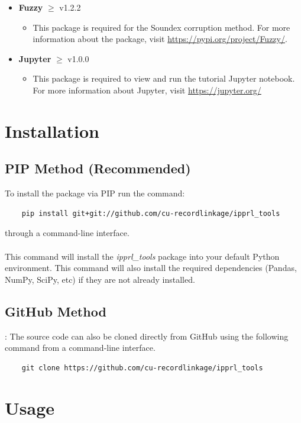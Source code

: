 \documentclass[titlepage, 11pt]{article}
\newcommand{\pkgname}{\textit{ipprl\_tools}}
\begin{document}
\begin{itemize}
    \item \textbf{Fuzzy} $\geq$ v1.2.2
    \begin{itemize}
        \item This package is required for the Soundex corruption method. For more information about the package, visit \url{https://pypi.org/project/Fuzzy/}.
    \end{itemize}
    \item \textbf{Jupyter} $\geq$ v1.0.0
    \begin{itemize}
        \item This package is required to view and run the tutorial Jupyter notebook. For more information about Jupyter, visit \url{https://jupyter.org/}
    \end{itemize}
\end{itemize}

\section{Installation}

\subsection{PIP Method (Recommended)}
To install the package via PIP run the command:
\begin{verbatim}
    pip install git+git://github.com/cu-recordlinkage/ipprl_tools
\end{verbatim}
through a command-line interface.
\\
\\
\noindent This command will install the \pkgname{} package into your default Python environment. This command will also install the required dependencies (Pandas, NumPy, SciPy, etc) if they are not already installed. 

\subsection{GitHub Method}: 
The source code can also be cloned directly from GitHub using the following command from a command-line interface.

\begin{verbatim}
    git clone https://github.com/cu-recordlinkage/ipprl_tools
\end{verbatim}

\section{Usage}
\end{document}

